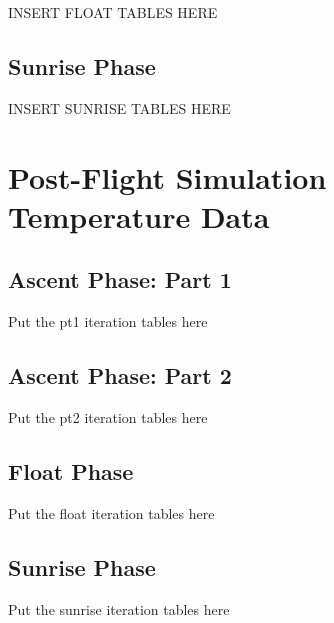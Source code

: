 INSERT FLOAT TABLES HERE

\section{Sunrise Phase}

INSERT SUNRISE TABLES HERE

\chapter{Post-Flight Simulation Temperature Data}\label{post_flight_sim_temp_data}

\section{Ascent Phase: Part 1}

Put the pt1 iteration tables here

\section{Ascent Phase: Part 2}

Put the pt2 iteration tables here

\section{Float Phase}

Put the float iteration tables here

\section{Sunrise Phase}

Put the sunrise iteration tables here